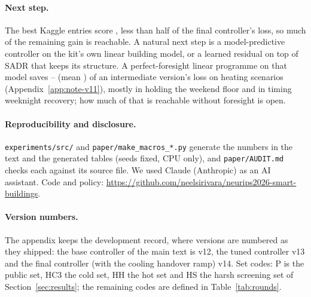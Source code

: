 \documentclass{article}
\begin{document}
\paragraph{Next step.} The best Kaggle entries score \FinKagBest, less than half of the final controller's loss, so much of the remaining gain is reachable. A natural next step is a model-predictive controller on the kit's own linear building model, or a learned residual on top of SADR that keeps its structure. A perfect-foresight linear programme on that model saves \RElvLpMin--\RElvLpMax{} (mean \RElvLpMean) of an intermediate version's loss on \RElvLpN{} heating scenarios (Appendix~\ref{app:note-v11}), mostly in holding the weekend floor and in timing weeknight recovery; how much of that is reachable without foresight is open.

\paragraph{Reproducibility and disclosure.} \texttt{experiments/src/} and \texttt{paper/make\_macros\_*.py} generate the numbers in the text and the generated tables (seeds fixed, CPU only), and \texttt{paper/AUDIT.md} checks each against its source file. We used Claude (Anthropic) as an AI assistant. Code and policy: \url{https://github.com/neelsirivara/neurips2026-smart-buildings}.



\clearpage
\appendix
\paragraph{Version numbers.} The appendix keeps the development record, where versions are numbered as they shipped: the base controller of the main text is v12, the tuned controller v13 and the final controller (with the cooling handover ramp) v14. Set codes: P is the public set, HC3 the cold set, HH the hot set and HS the harsh screening set of Section~\ref{sec:results}; the remaining codes are defined in Table~\ref{tab:rounds}.
\end{document}

